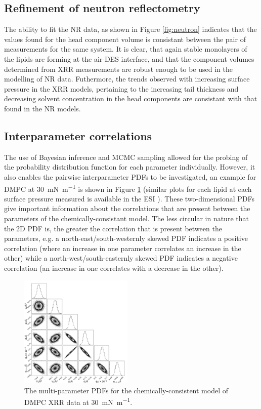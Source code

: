 \documentclass[amsmath,amssymb,twocolumn,superscriptaddress]{revtex4-1}
\begin{document}
\subsection{Refinement of neutron reflectometry}
%
The ability to fit the NR data, as shown in Figure \ref{fig:neutron} indicates that the values found for the head component volume is consistant between the pair of measurements for the same system.
It is clear, that again stable monolayers of the lipids are forming at the air-DES interface, and that the component volumes determined from XRR measurements are robust enough to be used in the modelling of NR data.
Futhermore, the trends observed with increasing surface pressure in the XRR models, pertaining to the increasing tail thickness and decreasing solvent concentration in the head components are consistant with that found in the NR models.

\subsection{Interparameter correlations}
%
The use of Bayesian inference and MCMC sampling allowed for the probing of the probability distribution function for each parameter individually.
However, it also enables the pairwise interparameter PDFs to be investigated, an example for DMPC at \SI{30}{\milli\newton\per\meter} is shown in Figure \ref{fig:dmpcpdfs} (similar plots for each lipid at each surface pressure measured is available in the ESI \cite{SI2019}).
These two-dimensional PDFs give important information about the correlations that are present between the parameters of the chemically-consistant model.
The less circular in nature that the 2D PDF is, the greater the correlation that is present between the parameters, e.g. a north-east/south-westernly skewed PDF indicates a positive correlation (where an increase in one parameter correlates an increase in the other) while a north-west/south-easternly skewed PDF indicates a negative correlation (an increase in one correlates with a decrease in the other).
%
\begin{figure}
	\centering
	\includegraphics[width=0.48\textwidth]{figures/dmpc3_all_corner}
	\caption{The multi-parameter PDFs for the chemically-consistent model of DMPC XRR data at \SI{30}{\milli\newton\per\meter}.}
	\label{fig:dmpcpdfs}
\end{figure}
%
\end{document}
